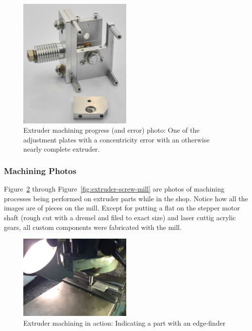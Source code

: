 \begin{figure}[h!]
\centering
\includegraphics[width=0.5\textwidth]{./figures/extruder-mistake-2}
\caption{Extruder machining progress (and error) photo: One of the adjustment plates with a concentricity error with an otherwise nearly complete extruder.}
\label{fig:extruder-mistake-2}
\end{figure}

\clearpage

\subsubsection{Machining Photos}


\indent

Figure~\ref{fig:extruder-edge-finder} through Figure~\ref{fig:extruder-screw-mill} are photos of machining processes being performed on extruder parts while in the shop. Notice how all the images are of pieces on the mill. Except for putting a flat on the stepper motor shaft (rough cut with a dremel and filed to exact size) and laser cuttig acrylic gears, all custom components were fabricated with the mill.\\

\begin{figure}[h!]
\centering
\includegraphics[width=0.5\textwidth]{./figures/extruder-edge-finder}
\caption{Extruder machining in action: Indicating a part with an edge-finder}
\label{fig:extruder-edge-finder}
\end{figure}

